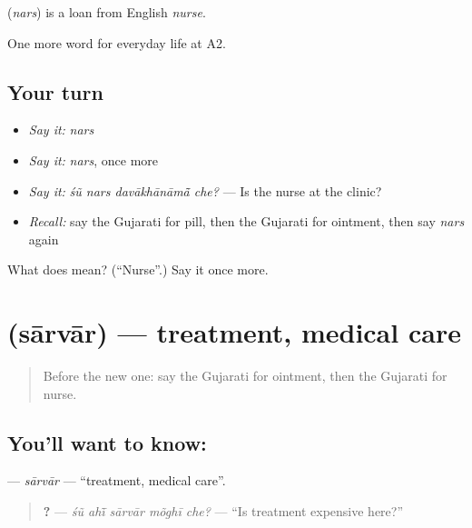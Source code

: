 \begin{cousinweb}
\textbf{} (\emph{nars}) is a loan from English \emph{nurse}.
\end{cousinweb}

\begin{grammarlens}[title={What you've built}]
One more word for everyday life at A2.
\end{grammarlens}

\subsection*{Your turn}
\begin{itemize}
\raggedright
  \item \emph{Say it:} \emph{nars}
  \item \emph{Say it:} \emph{nars}, once more
  \item \emph{Say it:} \emph{śũ nars davākhānāmā̃ che?} — Is the nurse at the clinic?
  \item \emph{Recall:} say the Gujarati for pill, then the Gujarati for ointment, then say \emph{nars} again
\end{itemize}

\begin{tcolorbox}[breakable,colback=teal!4,colframe=teal!35!black,title={Before you move on}]
What does  mean? (\textquotedblleft{}Nurse\textquotedblright{}.) Say it once more.
\end{tcolorbox}
\section[\texorpdfstring{\gu{સારવાર} (sārvār)}{સારવાર (sārvār)}]{ (sārvār) — treatment, medical care}

\label{lesson:GU-C231-sarvar}



\begin{quote}
Before the new one: say the Gujarati for ointment, then the Gujarati for nurse.
\end{quote}

\subsection*{You'll want to know: }
\textbf{} — \emph{sārvār} — \textquotedblleft{}treatment, medical care\textquotedblright{}.

\begin{quote}
\textbf{    ?} — \emph{śũ ahī̃ sārvār mõghī che?} — \textquotedblleft{}Is treatment expensive here?\textquotedblright{}
\end{quote}

